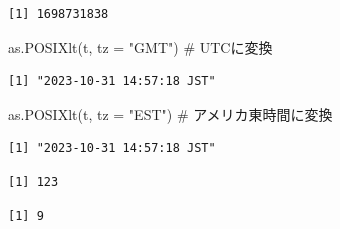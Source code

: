 \documentclass[
  letterpaper,
  DIV=11,
  numbers=noendperiod]{scrreprt}
\newenvironment{Shaded}{\begin{snugshade}}{\end{snugshade}}
\newcommand{\AttributeTok}[1]{\textcolor[rgb]{0.40,0.45,0.13}{#1}}
\newcommand{\CommentTok}[1]{\textcolor[rgb]{0.37,0.37,0.37}{#1}}
\newcommand{\FunctionTok}[1]{\textcolor[rgb]{0.28,0.35,0.67}{#1}}
\newcommand{\NormalTok}[1]{\textcolor[rgb]{0.00,0.23,0.31}{#1}}
\newcommand{\SpecialCharTok}[1]{\textcolor[rgb]{0.37,0.37,0.37}{#1}}
\newcommand{\StringTok}[1]{\textcolor[rgb]{0.13,0.47,0.30}{#1}}
\begin{document}
\begin{verbatim}
[1] 1698731838
\end{verbatim}

\begin{Shaded}
\begin{Highlighting}[]
\FunctionTok{as.POSIXlt}\NormalTok{(t, }\AttributeTok{tz =} \StringTok{"GMT"}\NormalTok{) }\CommentTok{\# UTCに変換}
\end{Highlighting}
\end{Shaded}

\begin{verbatim}
[1] "2023-10-31 14:57:18 JST"
\end{verbatim}

\begin{Shaded}
\begin{Highlighting}[]
\FunctionTok{as.POSIXlt}\NormalTok{(t, }\AttributeTok{tz =} \StringTok{"EST"}\NormalTok{) }\CommentTok{\# アメリカ東時間に変換}
\end{Highlighting}
\end{Shaded}

\begin{verbatim}
[1] "2023-10-31 14:57:18 JST"
\end{verbatim}

\begin{Shaded}
\end{Shaded}

\begin{verbatim}
[1] 123
\end{verbatim}

\begin{Shaded}
\end{Shaded}

\begin{verbatim}
[1] 9
\end{verbatim}

\begin{Shaded}
\end{Shaded}
\end{document}
